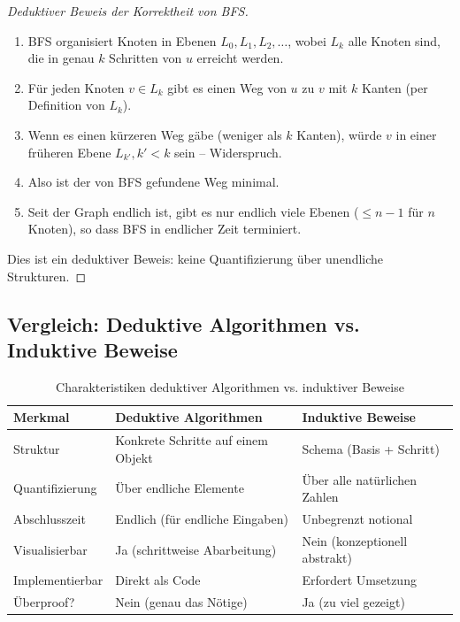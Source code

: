 \documentclass[12pt, a4paper]{article}
\theoremstyle{definition}
\theoremstyle{remark}
\begin{document}
\begin{proof}[Deduktiver Beweis der Korrektheit von BFS]
\begin{enumerate}[label=(\roman*)]
  \item BFS organisiert Knoten in Ebenen $L_0, L_1, L_2, \ldots$, wobei $L_k$ alle Knoten sind, die in genau $k$ Schritten von $u$ erreicht werden.
  
  \item Für jeden Knoten $v \in L_k$ gibt es einen Weg von $u$ zu $v$ mit $k$ Kanten (per Definition von $L_k$).
  
  \item Wenn es einen kürzeren Weg gäbe (weniger als $k$ Kanten), würde $v$ in einer früheren Ebene $L_{k'}, k' < k$ sein -- Widerspruch.
  
  \item Also ist der von BFS gefundene Weg minimal.
  
  \item Seit der Graph endlich ist, gibt es nur endlich viele Ebenen ($\leq n-1$ für $n$ Knoten), so dass BFS in endlicher Zeit terminiert.
\end{enumerate}

Dies ist ein deduktiver Beweis: keine Quantifizierung über unendliche Strukturen.
\end{proof}

\subsection{Vergleich: Deduktive Algorithmen vs. Induktive Beweise}
\label{subsec:vergleich_algo_induktion}

\begin{table}[H]
\centering
\caption{Charakteristiken deduktiver Algorithmen vs. induktiver Beweise}
\label{tab:algo_vs_induktion}
\begin{tabular}{p{3cm}|p{3.5cm}|p{3.5cm}}
\toprule
\textbf{Merkmal} & \textbf{Deduktive Algorithmen} & \textbf{Induktive Beweise} \\
\midrule
Struktur & Konkrete Schritte auf einem Objekt & Schema (Basis + Schritt) \\
Quantifizierung & Über endliche Elemente & Über alle natürlichen Zahlen \\
Abschlusszeit & Endlich (für endliche Eingaben) & Unbegrenzt notional \\
Visualisierbar & Ja (schrittweise Abarbeitung) & Nein (konzeptionell abstrakt) \\
Implementierbar & Direkt als Code & Erfordert Umsetzung \\
Überproof? & Nein (genau das Nötige) & Ja (zu viel gezeigt) \\
\bottomrule
\end{tabular}
\end{table}
\end{document}
